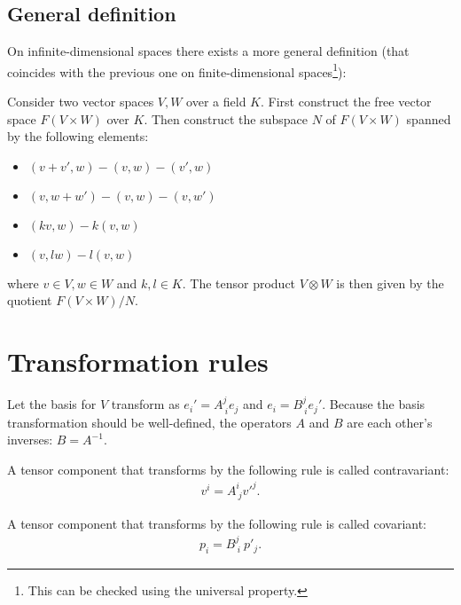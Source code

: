 \subsection{General definition}

	On infinite-dimensional spaces there exists a more general definition (that coincides with the previous one on finite-dimensional spaces\footnote{This can be checked using the universal property.}):
	\begin{construct}
		Consider two vector spaces $V, W$ over a field $K$. First construct the free vector space $F(V\times W)$ over $K$. Then construct the subspace $N$ of $F(V\times W)$ spanned by the following elements:
		\begin{itemize}
			\item $(v+v', w) - (v, w) - (v', w)$
			\item $(v, w+w') - (v, w) - (v, w')$
			\item $(kv, w) - k(v, w)$
			\item $(v, lw) - l(v, w)$
		\end{itemize}
		where $v\in V, w\in W$ and  $k,l\in K$. The tensor product $V\otimes W$ is then given by the quotient $F(V\times W)/N$.
	\end{construct}

\section{Transformation rules}

	Let the basis for $V$ transform as $e_i' = A^j_{\ i}e_j$ and $e_i = B^j_{\ i}e_j'$. Because the basis transformation should be well-defined, the operators $A$ and $B$ are each other's inverses: $B = A^{-1}$.

	\begin{definition}[Contravariant]\label{tensorcalculus:contravariant}
		A tensor component that transforms by the following rule is called contravariant:
	        \begin{gather}
		        v^i = A^i_{\ j}v'^j.
		\end{gather}
	\end{definition}
    
	\begin{definition}[Covariant]\label{tensorcalculus:covariant}
		A tensor component that transforms by the following rule is called covariant:
	        \begin{gather}
		        p_i = B^j_{\ i}\ p'_j.
		\end{gather}
	\end{definition}
    
